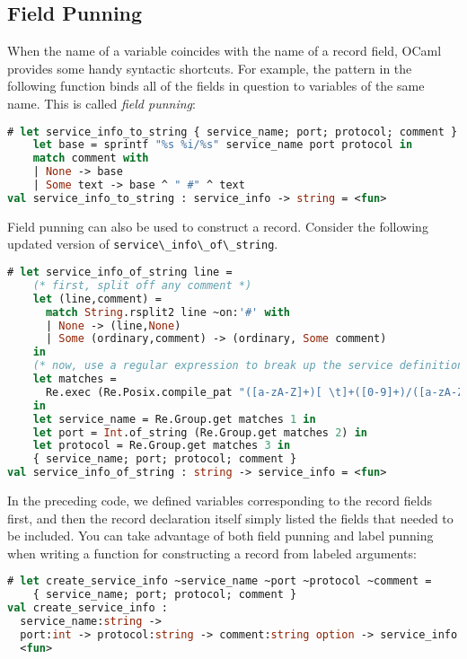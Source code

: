 \hypertarget{field-punning}{%
\subsection{Field Punning}\label{field-punning}}

When the name of a variable coincides with the name of a record field,
OCaml provides some handy syntactic shortcuts. For example, the pattern
in the following function binds all of the fields in question to
variables of the same name. This is called \emph{field
punning}:

\begin{lstlisting}[language=Caml]
# let service_info_to_string { service_name; port; protocol; comment } =
    let base = sprintf "%s %i/%s" service_name port protocol in
    match comment with
    | None -> base
    | Some text -> base ^ " #" ^ text
val service_info_to_string : service_info -> string = <fun>
\end{lstlisting}

Field punning can also be used to construct a record. Consider the
following updated version of
\passthrough{\lstinline!service\_info\_of\_string!}.

\begin{lstlisting}[language=Caml]
# let service_info_of_string line =
    (* first, split off any comment *)
    let (line,comment) =
      match String.rsplit2 line ~on:'#' with
      | None -> (line,None)
      | Some (ordinary,comment) -> (ordinary, Some comment)
    in
    (* now, use a regular expression to break up the service definition *)
    let matches =
      Re.exec (Re.Posix.compile_pat "([a-zA-Z]+)[ \t]+([0-9]+)/([a-zA-Z]+)") line
    in
    let service_name = Re.Group.get matches 1 in
    let port = Int.of_string (Re.Group.get matches 2) in
    let protocol = Re.Group.get matches 3 in
    { service_name; port; protocol; comment }
val service_info_of_string : string -> service_info = <fun>
\end{lstlisting}

In the preceding code, we defined variables corresponding to the record
fields first, and then the record declaration itself simply listed the
fields that needed to be included. You can take advantage of both field
punning and label punning when writing a function for constructing a
record from labeled arguments:

\begin{lstlisting}[language=Caml]
# let create_service_info ~service_name ~port ~protocol ~comment =
    { service_name; port; protocol; comment }
val create_service_info :
  service_name:string ->
  port:int -> protocol:string -> comment:string option -> service_info =
  <fun>
\end{lstlisting}

